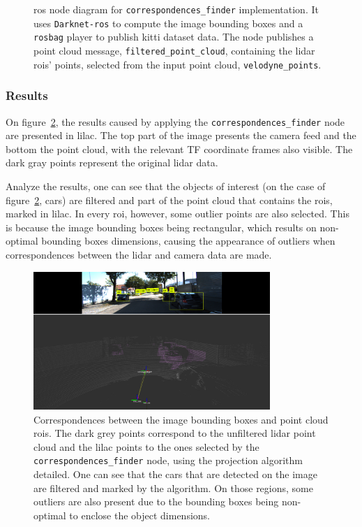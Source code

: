 \begin{figure}[H]
	\centering
	\def\svgwidth{\columnwidth}
	\graphicspath{{img/image-object-to-point-cloud/}}
		
	\caption{\ac{ros} node diagram for \texttt{correspondences\_finder} implementation. It uses \texttt{Darknet-ros} to compute the image bounding boxes and a \texttt{rosbag} player to publish \ac{kitti} dataset data. The node publishes a point cloud message, \texttt{filtered\_point\_cloud}, containing the \ac{lidar} \acp{roi}' points, selected from the input point cloud, \texttt{velodyne\_points}.}
	\label{fig:correspondences-finder-standalone}
\end{figure}

\subsubsection{Results}
On figure~\ref{fig:projected-correspondences}, the results caused by applying the \texttt{correspondences\_finder} node are presented in lilac. The top part of the image presents the camera feed and the bottom the point cloud, with the relevant TF coordinate frames also visible. The  dark gray points represent the original \ac{lidar} data. 

Analyze the results, one can see that the objects of interest (on the case of figure~\ref{fig:projected-correspondences}, cars) are filtered and part of the point cloud that contains the \acp{roi}, marked in lilac. In every \ac{roi}, however, some outlier points are also selected. This is because the image bounding boxes being rectangular, which results on non-optimal bounding boxes dimensions, causing the appearance of outliers when correspondences between the \ac{lidar} and camera data are made.

\begin{figure}[H]
	\centering
	\includegraphics[width=0.8\textwidth]{img/image-object-to-point-cloud/projected_correspondences.png}
	\caption{Correspondences between the image bounding boxes and point cloud \acp{roi}. The dark grey points correspond to the unfiltered \ac{lidar} point cloud and the lilac points to the ones selected by the \texttt{correspondences\_finder} node, using the projection algorithm detailed. One can see that the cars that are detected on the image are filtered and marked by the algorithm. On those regions, some outliers are also present due to the bounding boxes being non-optimal to enclose the object dimensions.}
	\label{fig:projected-correspondences}
\end{figure}

